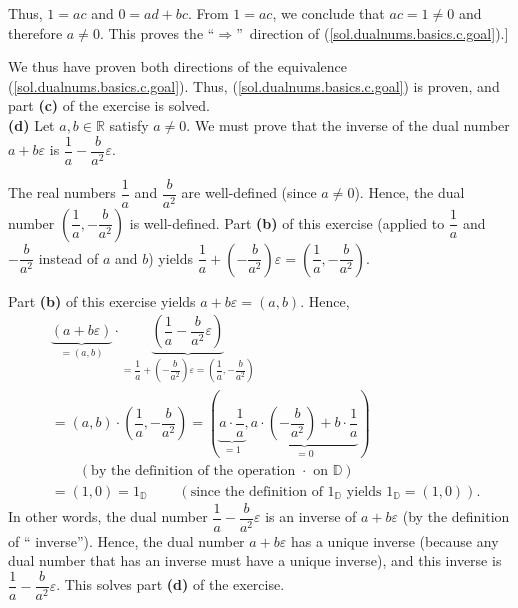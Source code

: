 \documentclass[paper=a4, fontsize=12pt]{scrartcl}%
\newcommand{\DD}{{\mathbb{D}}}
\newcommand{\tup}[1]{\left( #1 \right)}
\theoremstyle{plainsl}
\theoremstyle{definition}
\theoremstyle{remark}
\begin{document}
Thus, $1=ac$ and $0=ad+bc$. From $1=ac$, we conclude that $ac=1\neq0$ and
therefore $a\neq0$. This proves the \textquotedblleft$\Longrightarrow
$\textquotedblright\ direction of (\ref{sol.dualnums.basics.c.goal}).]

We thus have proven both directions of the equivalence
(\ref{sol.dualnums.basics.c.goal}). Thus, (\ref{sol.dualnums.basics.c.goal})
is proven, and part \textbf{(c)} of the exercise is solved.\\[0.4cm]

\textbf{(d)} Let $a,b\in\mathbb{R}$ satisfy $a\neq0$. We must prove that the
inverse of the dual number $a+b\varepsilon$ is $\dfrac{1}{a}-\dfrac{b}{a^{2}%
}\varepsilon$.

The real numbers $\dfrac{1}{a}$ and $\dfrac{b}{a^{2}}$ are well-defined (since
$a\neq0$). Hence, the dual number $\left(  \dfrac{1}{a},-\dfrac{b}{a^{2}%
}\right)  $ is well-defined. Part \textbf{(b)} of this exercise (applied to
$\dfrac{1}{a}$ and $-\dfrac{b}{a^{2}}$ instead of $a$ and $b$) yields
$\dfrac{1}{a}+\left(  -\dfrac{b}{a^{2}}\right)  \varepsilon=\left(  \dfrac
{1}{a},-\dfrac{b}{a^{2}}\right)  $.

Part \textbf{(b)} of this exercise yields $a+b\varepsilon=\left(  a,b\right)
$. Hence,%
\begin{align*}
&  \underbrace{\left(  a+b\varepsilon\right)  }_{=\left(  a,b\right)  }%
\cdot\underbrace{\left(  \dfrac{1}{a}-\dfrac{b}{a^{2}}\varepsilon\right)
}_{=\dfrac{1}{a}+\left(  -\dfrac{b}{a^{2}}\right)  \varepsilon=\left(
\dfrac{1}{a},-\dfrac{b}{a^{2}}\right)  }\\
&  =\left(  a,b\right)  \cdot\left(  \dfrac{1}{a},-\dfrac{b}{a^{2}}\right)
=\left(  \underbrace{a\cdot\dfrac{1}{a}}_{=1},\underbrace{a\cdot\left(
-\dfrac{b}{a^{2}}\right)  +b\cdot\dfrac{1}{a}}_{=0}\right) \\
& \qquad \tup{\text{by the definition of the operation $\cdot$ on $\DD$}} \\
&  =\left(  1,0\right)  =1_{\mathbb{D}}\ \ \ \ \ \ \ \ \ \ \left(  \text{since
the definition of }1_{\mathbb{D}}\text{ yields }1_{\mathbb{D}}=\left(
1,0\right)  \right)  .
\end{align*}
In other words, the dual number $\dfrac{1}{a}-\dfrac{b}{a^{2}}\varepsilon$ is
an inverse of $a+b\varepsilon$ (by the definition of \textquotedblleft
inverse\textquotedblright). Hence, the dual number $a+b\varepsilon$ has a
unique inverse (because any dual number that has an inverse must have a unique
inverse), and this inverse is $\dfrac{1}{a}-\dfrac{b}{a^{2}}\varepsilon$. This
solves part \textbf{(d)} of the exercise.\\[0.4cm]
\end{document}
